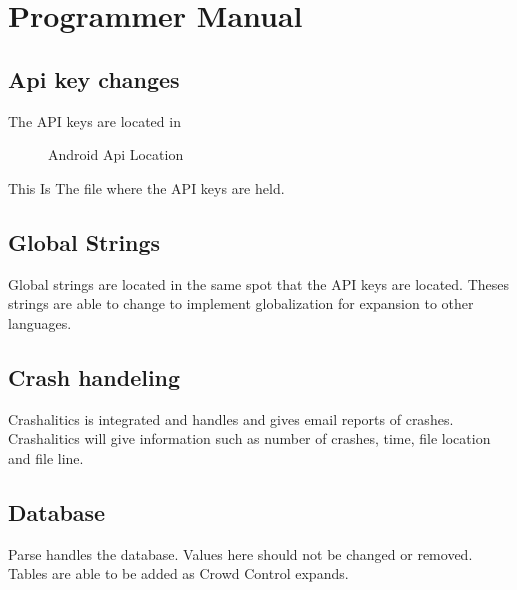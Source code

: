 \section{Programmer Manual}

\subsection{Api key changes}
The API keys are located in 

	\begin{figure}[tbh]
	\begin{center}
	\end{center}
	\caption{Android Api Location \label{AndroidApiLocation}}
	\end{figure}
	
	This Is The file where the API keys are held.
	
	\subsection{Global Strings}
	Global strings are located in the same spot that the API keys are located. Theses strings are able to change to implement globalization for expansion to other languages. 
	
	\subsection{Crash handeling}
	Crashalitics is integrated and handles and gives email reports of crashes. Crashalitics will give information such as number of crashes, time, file location and file line.
	
	\subsection{Database} 
	
	Parse handles the database. Values here should not be changed or removed. Tables are able to be added as Crowd Control expands.
